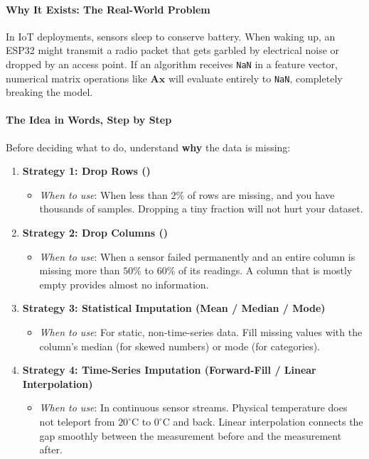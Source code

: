 \paragraph{Why It Exists: The Real-World Problem}
In IoT deployments, sensors sleep to conserve battery. When waking up, an ESP32 might transmit a radio packet that gets garbled by electrical noise or dropped by an access point. If an algorithm receives \texttt{NaN} in a feature vector, numerical matrix operations like $\mathbf{A}\mathbf{x}$ will evaluate entirely to \texttt{NaN}, completely breaking the model.

\paragraph{The Idea in Words, Step by Step}
Before deciding what to do, understand \textbf{why} the data is missing:
\begin{enumerate}
    \item \textbf{Strategy 1: Drop Rows ()}
    \begin{itemize}
        \item \textit{When to use}: When less than $2\%$ of rows are missing, and you have thousands of samples. Dropping a tiny fraction will not hurt your dataset.
    \end{itemize}
    \item \textbf{Strategy 2: Drop Columns ()}
    \begin{itemize}
        \item \textit{When to use}: When a sensor failed permanently and an entire column is missing more than $50\%$ to $60\%$ of its readings. A column that is mostly empty provides almost no information.
    \end{itemize}
    \item \textbf{Strategy 3: Statistical Imputation (Mean / Median / Mode)}
    \begin{itemize}
        \item \textit{When to use}: For static, non-time-series data. Fill missing values with the column's median (for skewed numbers) or mode (for categories).
    \end{itemize}
    \item \textbf{Strategy 4: Time-Series Imputation (Forward-Fill / Linear Interpolation)}
    \begin{itemize}
        \item \textit{When to use}: In continuous sensor streams. Physical temperature does not teleport from $20^\circ\text{C}$ to $0^\circ\text{C}$ and back. Linear interpolation connects the gap smoothly between the measurement before and the measurement after.
    \end{itemize}
\end{enumerate}

